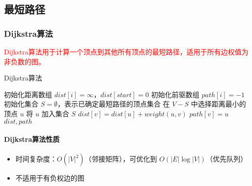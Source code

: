\documentclass{../../note}
\begin{document}
\subsection{最短路径}

\subsubsection{Dijkstra算法}

\textcolor{red}{Dijkstra算法用于计算一个顶点到其他所有顶点的最短路径，适用于所有边权值为非负数的图。}

\begin{algorithm}
\caption{Dijkstra算法}
\begin{algorithmic}[1]
  \State 初始化距离数组 $dist[i] = \infty$，$dist[start] = 0$
  \State 初始化前驱数组 $path[i] = -1$
  \State 初始化集合 $S = \emptyset$，表示已确定最短路径的顶点集合
  \State 在 $V-S$ 中选择距离最小的顶点 $u$
  \State 将 $u$ 加入集合 $S$
  \State $dist[v] = dist[u] + weight(u,v)$
  \State $path[v] = u$
  \EndIf
  \EndFor
  \EndWhile
  \State \Return $dist, path$
  \EndProcedure
\end{algorithmic}
\end{algorithm}

\paragraph{Dijkstra算法性质}
\begin{itemize}
\item 时间复杂度：$O(|V|^2)$（邻接矩阵），可优化到 $O(|E|\log|V|)$（优先队列）
\item 不适用于有负权边的图
\end{itemize}
\end{document}
